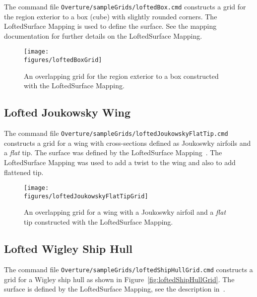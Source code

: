 \documentclass[xcolor=rgb,svgnames,dvipsnames]{article}
\newcommand{\figures}{../fig}
\begin{document}
The command file {\tt Overture/sampleGrids/loftedBox.cmd} constructs a grid for
the region exterior to a box (cube) with slightly rounded corners. 
The LoftedSurface Mapping is used to define the surface. See the mapping documentation
for further details on the LoftedSurface Mapping.

\begin{figure}[htb]
  \begin{center}
   \texttt{[image: \\figures/loftedBoxGrid]}
  \caption{An overlapping grid for the region exterior to a box constructed with the LoftedSurface Mapping. } \label{fig:loftedBoxGrid}
  \end{center}
\end{figure}



\subsection{Lofted Joukowsky Wing}\label{sec:LoftedJoukowskyWing}

The command file {\tt Overture/sampleGrids/loftedJoukowskyFlatTip.cmd} constructs a grid for
a wing with cross-sections defined as Joukoswky airfoils and a {\em flat} tip. The surface
was defined by the LoftedSurface Mapping~\cite{MAPPINGS}. The LoftedSurface Mapping was used to add a
twist to the wing and also to add flattened tip.

\begin{figure}[htb]
  \begin{center}
   \texttt{[image: \\figures/loftedJoukowskyFlatTipGrid]}
  \caption{An overlapping grid for a wing with a Joukoswky airfoil and a {\em flat} tip
            constructed with the LoftedSurface Mapping. } \label{fig:loftedJoukowskyWing}
  \end{center}
\end{figure}

\subsection{Lofted Wigley Ship Hull}\label{sec:LoftedWigleyShipHull}

The command file {\tt Overture/sampleGrids/loftedShipHullGrid.cmd} constructs a grid for
a Wigley ship hull as shown in Figure~\ref{fig:loftedShipHullGrid}. The surface
is defined by the LoftedSurface Mapping, see the description in~\cite{MAPPINGS}. 
\end{document}
